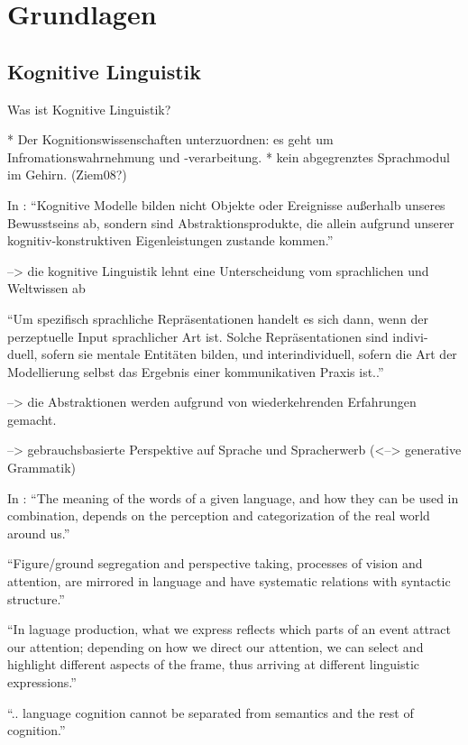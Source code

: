 \section{Grundlagen}

\subsection{Kognitive Linguistik}
Was ist Kognitive Linguistik?

* Der Kognitionswissenschaften unterzuordnen: es geht um Infromationswahrnehmung und -verarbeitung.
* kein abgegrenztes Sprachmodul im Gehirn. (Ziem08?)

In \cite{Ziem08}: ``Kognitive Modelle bilden nicht Objekte oder Ereignisse außerhalb unseres
Bewusstseins ab, sondern sind Abstraktionsprodukte, die allein aufgrund
unserer kognitiv-konstruktiven Eigenleistungen zustande kommen.''

--> die kognitive Linguistik lehnt eine Unterscheidung vom sprachlichen und Weltwissen ab

``Um spezifisch sprachliche Repräsentationen handelt es sich dann, wenn der
perzeptuelle Input sprachlicher Art ist. Solche Repräsentationen sind indivi-
duell, sofern sie mentale Entitäten bilden, und interindividuell, sofern die Art
der Modellierung selbst das Ergebnis einer kommunikativen Praxis ist..''

--> die Abstraktionen werden aufgrund von wiederkehrenden Erfahrungen gemacht.

--> gebrauchsbasierte Perspektive auf Sprache und Spracherwerb (<--> generative Grammatik)


In \cite{Ellis08}: ``The meaning of the words of a given language, and how they can be used in combination, depends on the perception and categorization of the real world around us.''

``Figure/ground segregation and perspective taking, processes of vision and attention, are mirrored in language and have systematic relations with syntactic structure.''

``In laguage production, what we express reflects which parts of an event attract our attention;
depending on how we direct our attention, we can select and highlight different aspects of the frame, thus arriving at different linguistic expressions.''

``.. language cognition cannot be separated from semantics and the rest of cognition.''

